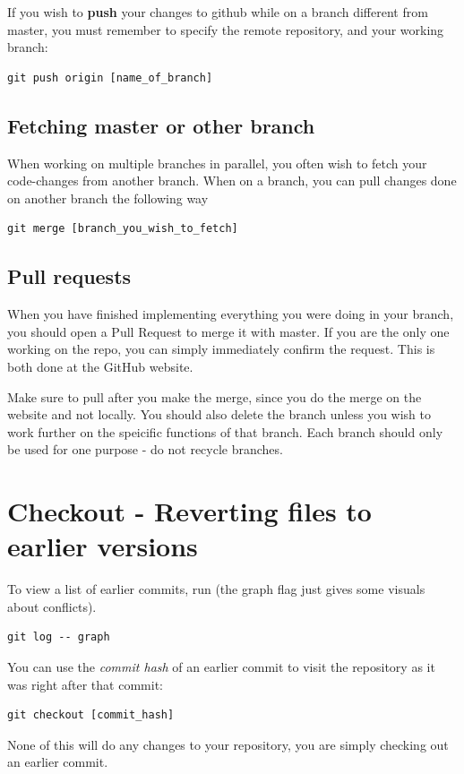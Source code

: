 \documentclass[12p,a4paper]{article}
\begin{document}
If you wish to \textbf{push} your changes to github while on a branch different from master, you must remember to specify the remote repository, and your working branch:
\begin{verbatim}
git push origin [name_of_branch]
\end{verbatim}


\subsection{Fetching master or other branch}
When working on multiple branches in parallel, you often wish to fetch your code-changes from another branch. When on a branch, you can pull changes done on another branch the following way
\begin{verbatim}
git merge [branch_you_wish_to_fetch]
\end{verbatim}

\subsection{Pull requests}
When you have finished implementing everything you were doing in your branch, you should open a Pull Request to merge it with master. If you are the only one working on the repo, you can simply immediately confirm the request. This is both done at the GitHub website.

Make sure to pull after you make the merge, since you do the merge on the website and not locally. You should also delete the branch unless you wish to work further on the speicific functions of that branch. Each branch should only be used for one purpose - do not recycle branches.


\newpage
\section{Checkout - Reverting files to earlier versions}
To view a list of earlier commits, run (the graph flag just gives some visuals about conflicts).
\begin{verbatim}
git log -- graph
\end{verbatim}
You can use the \textit{commit hash} of an earlier commit to visit the repository as it was right after that commit:
\begin{verbatim}
git checkout [commit_hash]
\end{verbatim}
None of this will do any changes to your repository, you are simply checking out an earlier commit.
\end{document}
